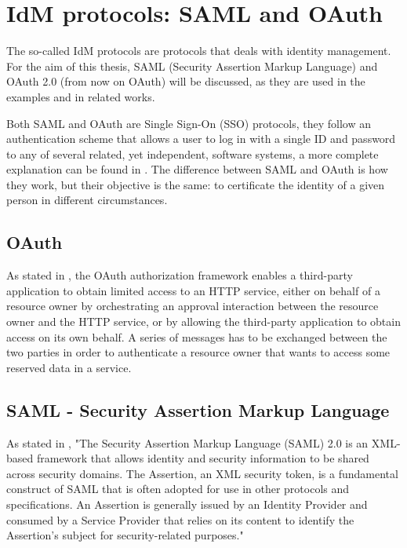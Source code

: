 \section{IdM protocols: SAML and OAuth}
The so-called IdM protocols are protocols that deals with identity management. For the aim of this thesis, \gls{SAML} (Security Assertion Markup Language) and \Gls{OAuth} 2.0 (from now on \Gls{OAuth}) will be discussed, as they are used in the examples and in related works.

Both \Gls{SAML} and \Gls{OAuth} are Single Sign-On (SSO) protocols, they follow an authentication scheme that allows a user to log in with a single ID and password to any of several related, yet independent, software systems, a more complete explanation can be found in \cite{claudio_grisenti}. 
The difference between \Gls{SAML} and \Gls{OAuth} is how they work, but their objective is the same: to certificate the identity of a given person in different circumstances.

\subsection{OAuth}
As stated in \cite{ietf_oauth2}, the \Gls{OAuth} authorization framework enables a third-party application to obtain limited access to an HTTP service, either on behalf of a resource owner by orchestrating an approval interaction between the resource owner and the HTTP service, or by allowing the third-party application to obtain access on its own behalf.
A series of messages has to be exchanged between the two parties in order to authenticate a resource owner that wants to access some reserved data in a service.

\subsection{SAML - Security Assertion Markup Language}
As stated in \cite{ietf_SAML}, "The Security Assertion Markup Language (\Gls{SAML}) 2.0 is an XML-based framework that allows identity and security information to be shared across security domains. The Assertion, an XML security token, is a fundamental construct of \Gls{SAML} that is often adopted for use in other protocols and specifications. An Assertion is generally issued by an Identity Provider and consumed by a Service Provider that relies on its content to identify the Assertion's subject for security-related purposes."






